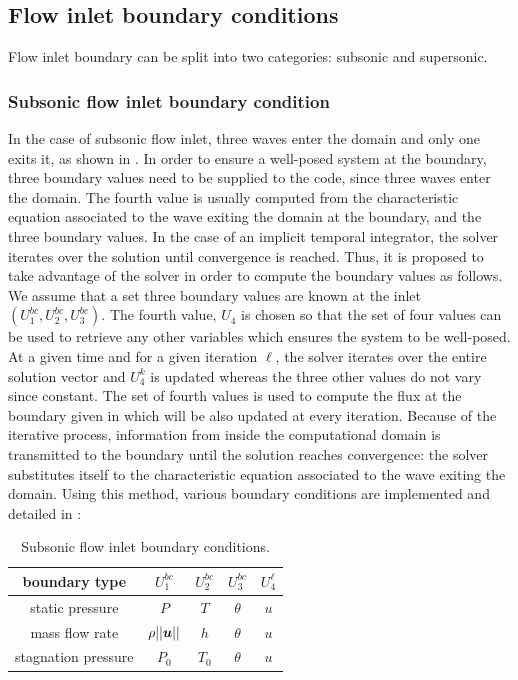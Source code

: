 \subsection{Flow inlet boundary conditions} \label{sec:flow-inlet-bc}
Flow inlet boundary can be split into two categories: subsonic and supersonic.
\subsubsection{Subsonic flow inlet boundary condition} \label{sec:sub-flow-inlet-bc}
In the case of subsonic flow inlet, three waves enter the domain and only one exits it, as shown in . In order to ensure a well-posed system at the boundary, three boundary values need to be supplied to the code, since three waves enter the domain. The fourth value is usually computed from the characteristic equation associated to the wave exiting the domain at the boundary, and the three boundary values. In the case of an implicit temporal integrator, the solver iterates over the solution until convergence is reached. Thus, it is proposed to take advantage of the solver in order to compute the boundary values as follows. We assume that a set three boundary values are known at the inlet $\left(U_1^{bc}, U_2^{bc}, U_3^{bc}\right)$. The fourth value, $U_4$ is chosen so that the set of four values can be used to retrieve any other variables which ensures the system to be well-posed. At a given time and for a given iteration $\ell$, the solver iterates over the entire solution vector and $U_4^k$ is updated whereas the three other values do not vary since constant. The set of fourth values is used to compute the flux at the boundary given in  which will be also updated at every iteration. Because of the iterative process, information from inside the computational domain is transmitted to the boundary until the solution reaches convergence: the solver substitutes itself to the characteristic equation associated to the wave exiting the domain. Using this method, various boundary conditions are implemented and detailed in :
%
\begin{table}[H]
\begin{center}
\caption{ Subsonic flow inlet boundary conditions.}
\label{tbl:sub-inlet-flow-bc}
\begin{tabular}{|c|c|c|c|c|}
 \hline
boundary type & $U_1^{bc}$  & $U_2^{bc}$ & $U_3^{bc}$ & $U_4^{\ell}$ \\  \hline
static pressure & $P$     & $T$    & $\theta$  & $u$     \\  \hline
mass flow rate  & $\rho|| \boldsymbol u||$     & $h$  & $\theta$  & $u$     \\  \hline
stagnation pressure & $P_0$  & $T_0$    & $\theta$  & $u$     \\  \hline
\end{tabular}
\end{center}
\end{table}
